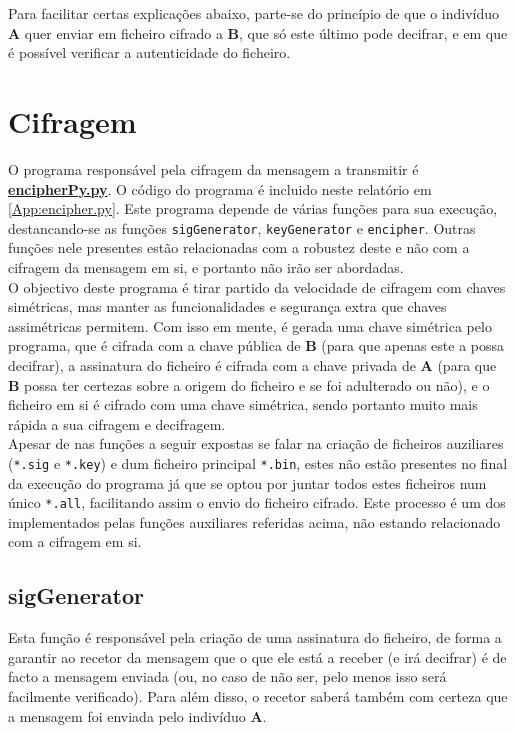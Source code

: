 \documentclass[a4paper,11pt,openright,oneside]{report}
\begin{document}
Para facilitar certas explicações abaixo, parte-se do princípio de que o indivíduo \textbf{A} quer enviar em ficheiro cifrado a \textbf{B}, que só este último pode decifrar, e em que é possível verificar a autenticidade do ficheiro.

\section{Cifragem}

O programa responsável pela cifragem da mensagem a transmitir é \href{run:../Python/Sender/encipherPy.py}{\textbf{encipherPy.py}}. O código do programa é incluido neste relatório em \ref{App:encipher.py}.
Este programa depende de várias funções para sua execução, destancando-se as funções \verb|sigGenerator|, \verb|keyGenerator| e \verb|encipher|. Outras funções nele presentes estão relacionadas com a robustez deste e não com a cifragem da mensagem em si, e portanto não irão ser abordadas.\\

O objectivo deste programa é tirar partido da velocidade de cifragem com chaves simétricas, mas manter as funcionalidades e segurança extra que chaves assimétricas permitem. Com isso em mente, é gerada uma chave simétrica pelo programa, que é cifrada com a chave pública de \textbf{B} (para que apenas este a possa decifrar), a assinatura do ficheiro é cifrada com a chave privada de \textbf{A} (para que \textbf{B} possa ter certezas sobre a origem do ficheiro e se foi adulterado ou não), e o ficheiro em si é cifrado com uma chave simétrica, sendo portanto muito mais rápida a sua cifragem e decifragem.\\

Apesar de nas funções a seguir expostas se falar na criação de ficheiros auziliares (\verb|*.sig| e \verb|*.key|) e dum ficheiro principal \verb|*.bin|, estes não estão presentes no final da execução do programa já que se optou por juntar todos estes ficheiros num único \verb|*.all|, facilitando assim o envio do ficheiro cifrado. Este processo é um dos implementados pelas funções auxiliares referidas acima, não estando relacionado com a cifragem em si.

\subsection{sigGenerator}

Esta função é responsável pela criação de uma assinatura do ficheiro, de forma a garantir ao recetor da mensagem que o que ele está a receber (e irá decifrar) é de facto a mensagem enviada (ou, no caso de não ser, pelo menos isso será facilmente verificado). Para além disso, o recetor saberá também com certeza que a mensagem foi enviada pelo indivíduo \textbf{A}.\\
\end{document}
